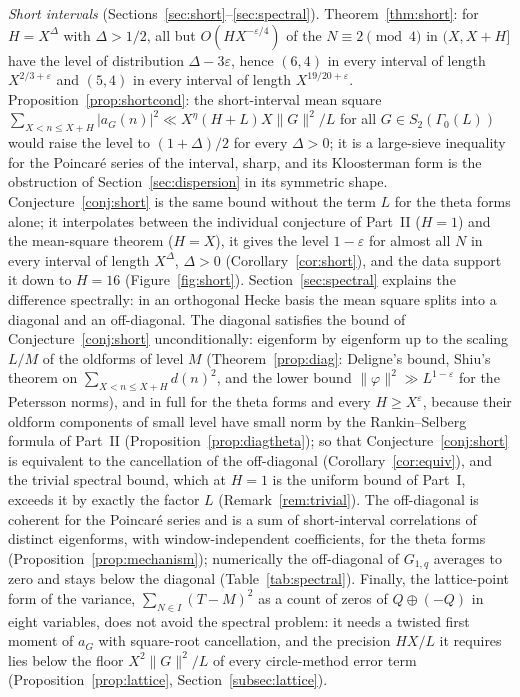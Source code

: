 \documentclass[11pt]{amsart}
\theoremstyle{remark}
\newcommand{\e}{\varepsilon}
\begin{document}
\emph{Short intervals} (Sections~\ref{sec:short}--\ref{sec:spectral}). Theorem~\ref{thm:short}: for $H=X^\Delta$ with $\Delta>1/2$, all but $O(HX^{-\e/4})$ of the $N\equiv2\pmod4$ in $(X,X+H]$ have the level of distribution $\Delta-3\e$, hence $(6,4)$ in every interval of length $X^{2/3+\e}$ and $(5,4)$ in every interval of length $X^{19/20+\e}$. Proposition~\ref{prop:shortcond}: the short-interval mean square $\sum_{X<n\le X+H}|a_G(n)|^2\ll X^\eta(H+L)X\|G\|^2/L$ for all $G\in S_2(\Gamma_0(L))$ would raise the level to $(1+\Delta)/2$ for every $\Delta>0$; it is a large-sieve inequality for the Poincar\'e series of the interval, sharp, and its Kloosterman form is the obstruction of Section~\ref{sec:dispersion} in its symmetric shape. Conjecture~\ref{conj:short} is the same bound without the term $L$ for the theta forms alone; it interpolates between the individual conjecture of Part~II ($H=1$) and the mean-square theorem ($H=X$), it gives the level $1-\e$ for almost all $N$ in every interval of length $X^\Delta$, $\Delta>0$ (Corollary~\ref{cor:short}), and the data support it down to $H=16$ (Figure~\ref{fig:short}). Section~\ref{sec:spectral} explains the difference spectrally: in an orthogonal Hecke basis the mean square splits into a diagonal and an off-diagonal. The diagonal satisfies the bound of Conjecture~\ref{conj:short} unconditionally: eigenform by eigenform up to the scaling $L/M$ of the oldforms of level $M$ (Theorem~\ref{prop:diag}: Deligne's bound, Shiu's theorem on $\sum_{X<n\le X+H}d(n)^2$, and the lower bound $\|\varphi\|^2\gg L^{1-\e}$ for the Petersson norms), and in full for the theta forms and every $H\ge X^\e$, because their oldform components of small level have small norm by the Rankin--Selberg formula of Part~II (Proposition~\ref{prop:diagtheta}); so that Conjecture~\ref{conj:short} is equivalent to the cancellation of the off-diagonal (Corollary~\ref{cor:equiv}), and the trivial spectral bound, which at $H=1$ is the uniform bound of Part~I, exceeds it by exactly the factor $L$ (Remark~\ref{rem:trivial}). The off-diagonal is coherent for the Poincar\'e series and is a sum of short-interval correlations of distinct eigenforms, with window-independent coefficients, for the theta forms (Proposition~\ref{prop:mechanism}); numerically the off-diagonal of $G_{1,q}$ averages to zero and stays below the diagonal (Table~\ref{tab:spectral}). Finally, the lattice-point form of the variance, $\sum_{N\in I}(T-M)^2$ as a count of zeros of $Q\oplus(-Q)$ in eight variables, does not avoid the spectral problem: it needs a twisted first moment of $a_G$ with square-root cancellation, and the precision $HX/L$ it requires lies below the floor $X^2\|G\|^2/L$ of every circle-method error term (Proposition~\ref{prop:lattice}, Section~\ref{subsec:lattice}).
\end{document}
